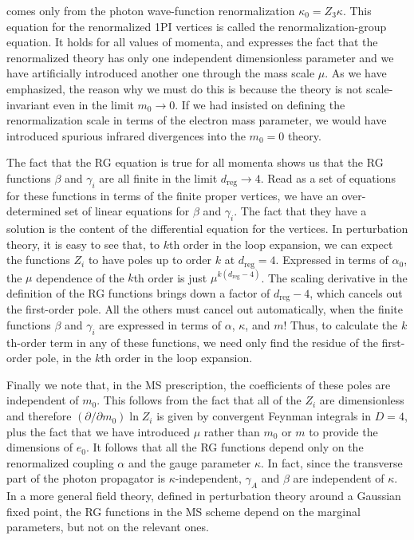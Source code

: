 comes only from the photon wave-function renormalization $\kappa_0=Z_3\kappa$.
This equation for the renormalized 1PI vertices is called the
renormalization-group equation. It holds for all values of momenta, and
expresses the fact that the renormalized theory has only one independent
dimensionless parameter and we have artificially introduced another one
through the mass scale $\mu$. As we have emphasized, the reason why we must do
this is because the theory is not scale-invariant even in the limit $m_0\to0$.
If we had insisted on defining the renormalization scale in terms of the
electron mass parameter, we would have introduced spurious infrared
divergences into the $m_0=0$ theory.

The fact that the RG equation is true for all momenta shows us that the RG
functions $\beta$ and $\gamma_i$ are all finite in the limit
$d_{\mathrm{reg}}\to4$. Read as
a set of equations for these functions in terms of the finite proper vertices,
we have an over-determined set of linear equations for $\beta$ and $\gamma_i$.
The fact that they have a solution is the content of the differential equation
for the vertices. In perturbation theory, it is easy to see that, to $k$th
order in the loop expansion, we can expect the functions $Z_i$ to have poles up
to order $k$ at $d_{\mathrm{reg}}=4$. Expressed in terms of $\alpha_0$, the
$\mu$ dependence of the $k$th order is just
$\mu^{k(d_{\mathrm{reg}}-4)}$. The scaling derivative in the definition of the
RG functions brings down a factor of $d_{\mathrm{reg}}-4$, which cancels
out the first-order pole. All the others must cancel out automatically, when
the finite functions $\beta$ and $\gamma_i$ are expressed in terms of $\alpha$,
$\kappa$, and $m$! Thus, to calculate the $k$th-order term in any of these
functions, we need only find the residue of the first-order pole, in the $k$th
order in the loop expansion.


Finally we note that, in the MS prescription, the coefficients of these poles
are independent of $m_0$. This follows from the fact that all of the $Z_i$ are
dimensionless and therefore $(\partial/\partial m_0)\ln Z_i$ is given by
convergent Feynman integrals in $D=4$, plus the fact that we have introduced
$\mu$ rather than $m_0$ or $m$ to provide the dimensions of $e_0$. It follows
that all the RG functions depend only on the renormalized coupling $\alpha$ and
the gauge parameter $\kappa$. In fact, since the transverse part of the photon
propagator is $\kappa$-independent, $\gamma_A$ and $\beta$ are independent of
$\kappa$. In a more general field theory, defined in perturbation theory around
a Gaussian fixed point, the RG functions in the MS scheme depend on the
marginal parameters, but not on the relevant ones.

